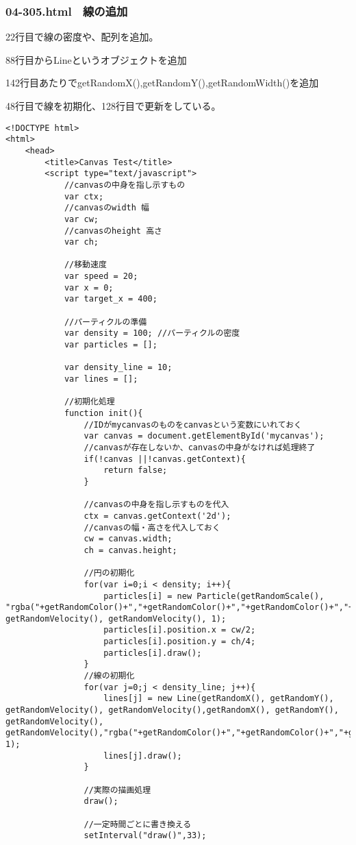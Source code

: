 \documentclass[mingoth,11pt,a4j,uplatex]{jsarticle}
\begin{document}
\subsubsection{04-305.html　線の追加}
22行目で線の密度や、配列を追加。

88行目からLineというオブジェクトを追加

142行目あたりでgetRandomX(),getRandomY(),getRandomWidth()を追加

48行目で線を初期化、128行目で更新をしている。
\begin{lstlisting}[caption=線の追加]
<!DOCTYPE html>
<html>
	<head>
		<title>Canvas Test</title>
		<script type="text/javascript">
			//canvasの中身を指し示すもの
			var ctx;
			//canvasのwidth 幅
			var cw;
			//canvasのheight 高さ
			var ch;
			
			//移動速度
			var speed = 20;
			var x = 0;
			var target_x = 400;
			
			//パーティクルの準備
			var density = 100; //パーティクルの密度
			var particles = [];
			
			var density_line = 10;
			var lines = [];
			
			//初期化処理
			function init(){
				//IDがmycanvasのものをcanvasという変数にいれておく
				var canvas = document.getElementById('mycanvas');
				//canvasが存在しないか、canvasの中身がなければ処理終了
				if(!canvas ||!canvas.getContext){
					return false;
				}
				
				//canvasの中身を指し示すものを代入
				ctx = canvas.getContext('2d');
				//canvasの幅・高さを代入しておく
				cw = canvas.width;
				ch = canvas.height;
				
				//円の初期化
				for(var i=0;i < density; i++){
					particles[i] = new Particle(getRandomScale(), "rgba("+getRandomColor()+","+getRandomColor()+","+getRandomColor()+","+getRandomAlpha()+")", getRandomVelocity(), getRandomVelocity(), 1);
					particles[i].position.x = cw/2;
					particles[i].position.y = ch/4;
					particles[i].draw();			
				}
				//線の初期化
				for(var j=0;j < density_line; j++){
					lines[j] = new Line(getRandomX(), getRandomY(), getRandomVelocity(), getRandomVelocity(),getRandomX(), getRandomY(), getRandomVelocity(), getRandomVelocity(),"rgba("+getRandomColor()+","+getRandomColor()+","+getRandomColor()+","+getRandomAlpha()+")",getRandomWidth(), 1);
					lines[j].draw();
				}
				
				//実際の描画処理
				draw();
				
				//一定時間ごとに書き換える
				setInterval("draw()",33);


\end{lstlisting}
\end{document}

